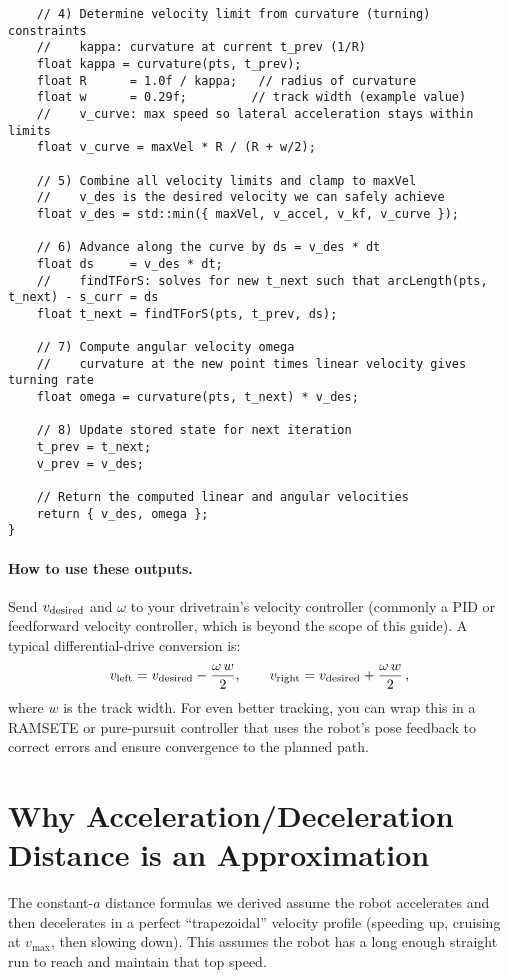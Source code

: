 \documentclass[11pt]{article}
\begin{document}
\begin{lstlisting}
    // 4) Determine velocity limit from curvature (turning) constraints
    //    kappa: curvature at current t_prev (1/R)
    float kappa = curvature(pts, t_prev);
    float R      = 1.0f / kappa;   // radius of curvature
    float w      = 0.29f;         // track width (example value)
    //    v_curve: max speed so lateral acceleration stays within limits
    float v_curve = maxVel * R / (R + w/2);

    // 5) Combine all velocity limits and clamp to maxVel
    //    v_des is the desired velocity we can safely achieve
    float v_des = std::min({ maxVel, v_accel, v_kf, v_curve });

    // 6) Advance along the curve by ds = v_des * dt
    float ds     = v_des * dt;
    //    findTForS: solves for new t_next such that arcLength(pts, t_next) - s_curr = ds
    float t_next = findTForS(pts, t_prev, ds);

    // 7) Compute angular velocity omega
    //    curvature at the new point times linear velocity gives turning rate
    float omega = curvature(pts, t_next) * v_des;

    // 8) Update stored state for next iteration
    t_prev = t_next;
    v_prev = v_des;

    // Return the computed linear and angular velocities
    return { v_des, omega };
}
\end{lstlisting}

\paragraph{How to use these outputs.} Send \(v_{\rm desired}\) and \(\omega\) to your drivetrain’s velocity controller (commonly a PID or feedforward velocity controller, which is beyond the scope of this guide). A typical differential-drive conversion is:
\[
v_{\rm left}  = v_{\rm desired} - \frac{\omega\,w}{2},\qquad
v_{\rm right} = v_{\rm desired} + \frac{\omega\,w}{2}\,,
\] 
where $w$ is the track width. For even better tracking, you can wrap this in a RAMSETE or pure-pursuit controller that uses the robot’s pose feedback to correct errors and ensure convergence to the planned path.

\section{Why Acceleration/Deceleration Distance is an Approximation}

The constant-$a$ distance formulas we derived assume the robot accelerates and then decelerates in a perfect “trapezoidal” velocity profile (speeding up, cruising at $v_{\max}$, then slowing down). This assumes the robot has a long enough straight run to reach and maintain that top speed.
\end{document}
